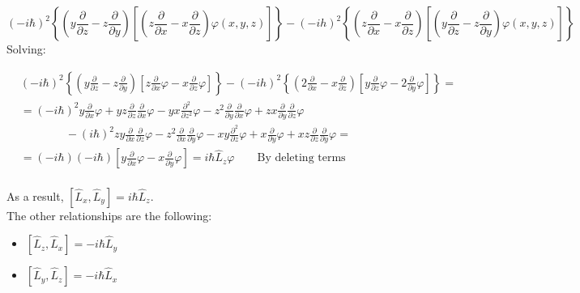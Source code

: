 	$$(-i \hbar)^{2}\left\{\left(y \frac{\partial}{\partial z}-z \frac{\partial}{\partial y}\right)\left[\left(z \frac{\partial}{\partial x}-x \frac{\partial}{\partial z}\right) \varphi(x, y, z)\right]\right\}-(-i h)^{2}\left\{\left(z \frac{\partial}{\partial x}-x \frac{\partial}{\partial z}\right)\left[\left(y \frac{\partial}{\partial z}-z \frac{\partial}{\partial y}\right) \varphi(x, y, z)\right]\right\}
	$$
	Solving:

	\begin{align*}
		&(-i \hbar)^{2}\left\{\left(y \frac{\partial}{\partial z}-z \frac{\partial}{\partial y}\right)\left[z \frac{\partial}{\partial x} \varphi-x \frac{\partial}{\partial z} \varphi\right]\right\}-(-i h)^{2}\left\{\left(2 \frac{\partial}{\partial x}-x \frac{\partial}{\partial z}\right)\left[y \frac{\partial}{\partial z} \varphi-2 \frac{\partial}{\partial y} \varphi\right]\right\}=\\
		&=(-i \hbar)^{2}{y \frac{\partial}{\partial x} \varphi+y z \frac{\partial}{\partial z} \frac{\partial}{\partial x} \varphi-y x \frac{\partial^{2}}{\partial z^{2}} \varphi-z^{2} \frac{\partial}{\partial y} \frac{\partial}{\partial x} \varphi+z x \frac{\partial}{\partial y} \frac{\partial}{\partial z} \varphi} \\
		&\qquad\qquad-(i\hbar)^{2}{z y \frac{\partial}{\partial x} \frac{\partial}{\partial z} \varphi-z^{2} \frac{\partial}{\partial x} \frac{\partial}{\partial y} \varphi-x y \frac{\partial^{2}}{\partial z} \varphi+x \frac{\partial}{\partial y} \varphi+x z \frac{\partial}{\partial z} \frac{\partial}{\partial y} \varphi}=\\
		&=(-i \hbar)(-i \hbar)[y \frac{\partial}{\partial x} \varphi-x\frac{\partial}{\partial y}\varphi] = i\hbar \hat{L}_{z}\varphi \qquad \text {By deleting terms}\\
\end{align*}

	As a result, $\left[\hat{L}_{x}, \hat{L}_{y}\right]=i\hbar \hat{L}_{z}$.\\

	\noindent
	The other relationships are the following:

	\begin{multicols}{2}
		\begin{itemize}
			\item $\left[\hat{L}_{z}, \hat{L}_{x}\right]=-i \hbar \hat{L}_{y}$
			\item $\left[\hat{L}_{y}, \hat{L}_{z}\right]=-i \hbar \hat{L}_{x}$
		\end{itemize}
	\end{multicols}

